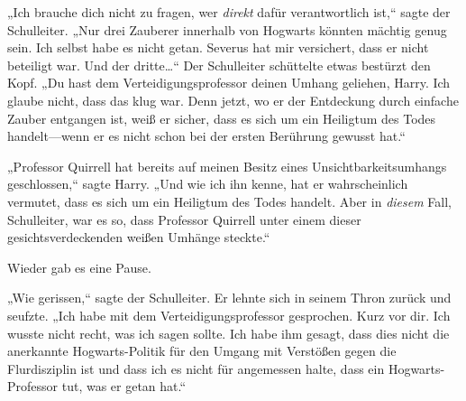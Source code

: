 „Ich brauche dich nicht zu fragen, wer \emph{direkt} dafür verantwortlich ist,“ sagte der Schulleiter. „Nur drei Zauberer innerhalb von Hogwarts könnten mächtig genug sein. Ich selbst habe es nicht getan. Severus hat mir versichert, dass er nicht beteiligt war. Und der dritte…“ Der Schulleiter schüttelte etwas bestürzt den Kopf. „Du hast dem Verteidigungsprofessor deinen Umhang geliehen, Harry. Ich glaube nicht, dass das klug war. Denn jetzt, wo er der Entdeckung durch einfache Zauber entgangen ist, weiß er sicher, dass es sich um ein Heiligtum des Todes handelt—wenn er es nicht schon bei der ersten Berührung gewusst hat.“

„Professor Quirrell hat bereits auf meinen Besitz eines Unsichtbarkeitsumhangs geschlossen,“ sagte Harry. „Und wie ich ihn kenne, hat er wahrscheinlich vermutet, dass es sich um ein Heiligtum des Todes handelt. Aber in \emph{diesem} Fall, Schulleiter, war es so, dass Professor Quirrell unter einem dieser gesichtsverdeckenden weißen Umhänge steckte.“

Wieder gab es eine Pause.

„Wie gerissen,“ sagte der Schulleiter. Er lehnte sich in seinem Thron zurück und seufzte. „Ich habe mit dem Verteidigungsprofessor gesprochen. Kurz vor dir. Ich wusste nicht recht, was ich sagen sollte. Ich habe ihm gesagt, dass dies nicht die anerkannte Hogwarts-Politik für den Umgang mit Verstößen gegen die Flurdisziplin ist und dass ich es nicht für angemessen halte, dass ein Hogwarts-Professor tut, was er getan hat.“

